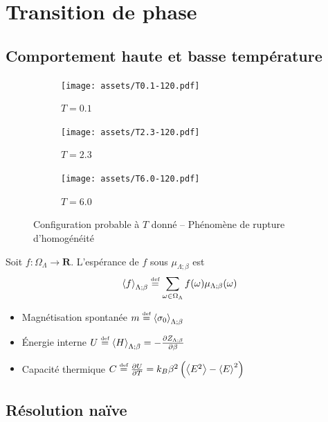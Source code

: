 \documentclass[french]{beamer}
\newcommand\eqdef{\overset{\mbox{\tiny def}}{=}}
\begin{document}
\section{Transition de phase}
\subsection{Comportement haute et basse température}
\begin{frame}

\begin{figure}
	\begin{subfigure}{0.3\textwidth}
		\texttt{[image: assets/T0.1-120.pdf]}
		\caption{$T= 0.1$}
	\end{subfigure}
	\begin{subfigure}{0.3\textwidth}
		\texttt{[image: assets/T2.3-120.pdf]}
		\caption{$T= 2.3$}
	\end{subfigure}
	\begin{subfigure}{0.3\textwidth}
		\texttt{[image: assets/T6.0-120.pdf]}
		\caption{$T= 6.0$}
	\end{subfigure}
	\caption{Configuration probable à $T$ donné -- Phénomène de rupture d'homogénéité}
\end{figure}

\end{frame}


\begin{frame}
\begin{definition}[Espérance]
    Soit $f : \Omega_\Lambda \to \mathbf{R}$. L'espérance de $f$ sous $\mu_{\Lambda;\beta}$ est
    \[ \left\langle f \right\rangle_{\Lambda;\beta} \eqdef \sum_{\omega \in \Omega_\Lambda} f(\omega)\mu_{\Lambda;\beta}(\omega)\]
\end{definition}

\begin{itemize}
	\item  Magnétisation spontanée $m \eqdef \left<  \sigma_0  \right>_{\Lambda;\beta}$
	\item \'Energie interne $U \eqdef \left< H \right>_{\Lambda;\beta} = - \frac{\partial Z_{\Lambda;\beta}}{\partial \beta}$
	\item Capacité thermique $C \eqdef \frac{\partial U}{\partial T} = k_B\beta^2 \left(\left<E^2\right> -  \left<E\right>^2\right)$
\end{itemize}
\end{frame}

%
\subsection{Résolution naïve}
%
\end{document}
